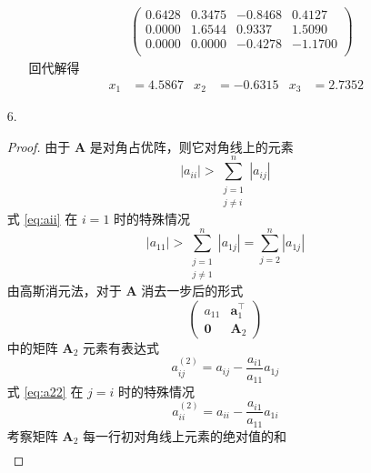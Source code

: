 \documentclass{sjtuarticle}
\begin{document}
\begin{itemize}
\begin{itemize}
\begin{solution}
\begin{align*}
          &\begin{pmatrix}
                0.6428 &       0.3475 &      -0.8468 &        0.4127\\
                0.0000 &       1.6544 &       0.9337 &        1.5090\\
                0.0000 &       0.0000 &      -0.4278 &       -1.1700\\
          \end{pmatrix}
        \end{align*}
        回代解得
          \begin{align*}
          x_1&=      4.5867 & x_2&=     -0.6315 & x_3&=      2.7352
          \end{align*}
        \end{solution}
    \end{itemize}
    \item[6.] \begin{proof}
        由于 $\bm{A}$ 是对角占优阵，则它对角线上的元素
        \begin{equation}\label{eq:aii}
            |a_{ii}|>\sum_{\substack{j=1\\j\neq i}}^n |a_{ij}|
        \end{equation}
        式 \eqref{eq:aii} 在 $i=1$ 时的特殊情况
        \begin{equation}\label{eq:a11}
            |a_{11}|>\sum_{\substack{j=1\\j\neq 1}}^n |a_{1j}|=\sum_{j=2}^n |a_{1j}|
        \end{equation}
        由高斯消元法，对于 $\bm{A}$ 消去一步后的形式
        \begin{equation*}
            \begin{pmatrix}
                a_{11} & \bm{a}_1^\top \\
                \bm{0} & \bm{A}_2
            \end{pmatrix}
        \end{equation*}
        中的矩阵 $\bm{A}_2$ 元素有表达式
        \begin{equation}\label{eq:a22}
            a_{ij}^{(2)}=a_{ij}-\frac{a_{i1}}{a_{11}}a_{1j}
        \end{equation}
        式 \eqref{eq:a22} 在 $j=i$ 时的特殊情况
        \begin{equation}\label{eq:a22ii}
            a_{ii}^{(2)}=a_{ii}-\frac{a_{i1}}{a_{11}}a_{1i}
        \end{equation}
        考察矩阵 $\bm{A}_2$ 每一行初对角线上元素的绝对值的和
        \begin{align*}

\end{align*}
\end{proof}
\end{itemize}
\end{document}
